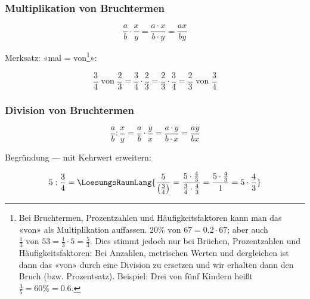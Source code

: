 

\newpage




\subsubsection{Multiplikation von Bruchtermen}

\begin{gesetz}{}{}
$$\frac{a}{b}\cdot\frac{x}{y} = \frac{a\cdot x}{b\cdot y} = \frac{ax}{by}$$
\end{gesetz}

Merksatz:
«mal = von\footnote{Bei Bruchtermen, Prozentzahlen und
Häufigkeitsfaktoren kann man das «von» als Multiplikation
auffassen. $20\% \textrm{ von } 67 = 0.2 \cdot{} 67$; aber auch
$\frac{1}{3} \textrm{ von } 53
= \frac{1}{3}\cdot{5}=\frac{5}{3}$. Dies stimmt jedoch nur bei
Brüchen, Prozentzahlen und Häufigkeitsfaktoren: Bei Anzahlen,
metrischen Werten und dergleichen ist dann das «von» durch eine
Division zu ersetzen und wir erhalten dann den Bruch
(bzw. Prozentsatz). Beispiel: Drei von fünf Kindern heißt $\frac{3}{5}
= 60\% = 0.6$.}»:

$$\frac34 \textrm{ von } \frac23 = \frac34\cdot\frac23
=  \frac23\cdot\frac34 = \frac23 \textrm{ von } \frac34$$


\subsubsection{Division von Bruchtermen}
\begin{gesetz}{}{}
$$\frac{a}{b} : \frac{x}{y}=\frac{a}{b}\cdot\frac{y}{x} = \frac{a\cdot y}{b\cdot x} = \frac{ay}{bx}$$
\end{gesetz}

Begründung — mit Kehrwert erweitern:

$$5 : \frac{3}{4} = \LoesungsRaumLang{
\frac{5}{\left(\frac{3}{4}\right)} =
\frac{5\cdot{}\frac43}{\frac34\cdot{}\frac43} =
\frac{5\cdot{}\frac43}{1} = 5 \cdot{} \frac43}$$
\newpage

